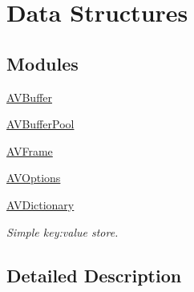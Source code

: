 \hypertarget{group__lavu__data}{}\section{Data Structures}
\label{group__lavu__data}
\subsection*{Modules}
\begin{DoxyCompactItemize}
\item 
\hyperlink{group__lavu__buffer}{A\+V\+Buffer}
\item 
\hyperlink{group__lavu__bufferpool}{A\+V\+Buffer\+Pool}
\item 
\hyperlink{group__lavu__frame}{A\+V\+Frame}
\item 
\hyperlink{group__avoptions}{A\+V\+Options}
\item 
\hyperlink{group__lavu__dict}{A\+V\+Dictionary}
\begin{DoxyCompactList}\small\item\em Simple key\+:value store. \end{DoxyCompactList}\end{DoxyCompactItemize}


\subsection{Detailed Description}
